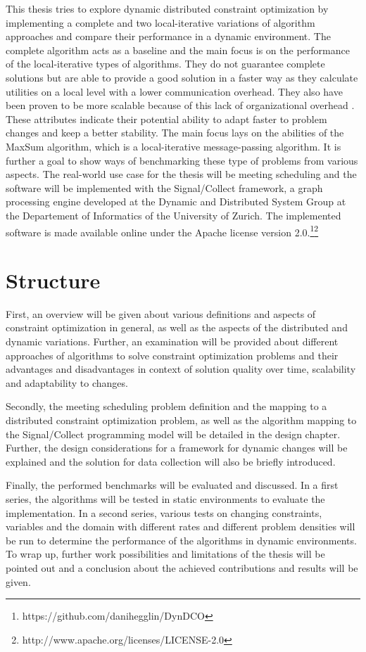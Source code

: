 This thesis tries to explore dynamic distributed constraint optimization by implementing a complete and two local-iterative variations of algorithm approaches and compare their performance in a dynamic environment. The complete algorithm acts as a baseline and the main focus is on the performance of the local-iterative types of algorithms. They do not guarantee complete solutions but are able to provide a good solution in a faster way as they calculate utilities on a local level with a lower communication overhead. They also have been proven to be more scalable because of this lack of organizational overhead \cite{Chapman2011}. These attributes indicate their potential ability to adapt faster to problem changes and keep a better stability. The main focus lays on the abilities of the MaxSum algorithm, which is a local-iterative message-passing algorithm. It is further a goal to show ways of benchmarking these type of problems from various aspects. The real-world use case for the thesis will be meeting scheduling and the software will be implemented with the Signal/Collect framework, a graph processing engine developed at  the Dynamic and Distributed System Group at the Departement of Informatics of the University of Zurich.
\newline \newline
The implemented software is made available online under the Apache license version 2.0.\footnote{https://github.com/danihegglin/DynDCO}\footnote{http://www.apache.org/licenses/LICENSE-2.0}


\section{Structure}
First, an overview will be given about various definitions and aspects of constraint optimization in general, as well as the aspects of  the distributed and dynamic variations. Further, an examination will be provided about different approaches of algorithms to solve constraint optimization problems and their advantages and disadvantages in context of solution quality over time, scalability and adaptability to changes. 

Secondly, the meeting scheduling problem definition and the mapping to a distributed constraint optimization problem, as well as the algorithm mapping to the Signal/Collect programming model will be detailed in the design chapter. Further, the design considerations for a framework for dynamic changes will be explained and the solution for data collection will also be briefly introduced.

Finally, the performed benchmarks will be evaluated and discussed. In a first series, the algorithms will be tested in static environments to evaluate the implementation. In a second series, various tests on changing constraints, variables and the domain with different rates and different problem densities will be run to determine the performance of the algorithms in dynamic environments. To wrap up, further work possibilities and limitations of the thesis will be pointed out and a conclusion about the achieved contributions and results will be given.